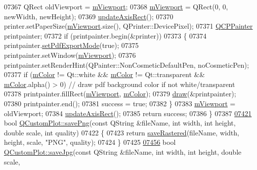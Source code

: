 \begin{DoxyCode}
07367   QRect oldViewport = \hyperlink{a00116_a69feeea9d5254eab8ba7f9be13f85e0b}{mViewport};
07368   \hyperlink{a00116_a69feeea9d5254eab8ba7f9be13f85e0b}{mViewport} = QRect(0, 0, newWidth, newHeight);
07369   \hyperlink{a00116_a428242419d3a1b63f2cbff637986c35c}{updateAxisRect}();
07370   printer.setPaperSize(\hyperlink{a00116_a69feeea9d5254eab8ba7f9be13f85e0b}{mViewport}.size(), QPrinter::DevicePixel);
07371   \hyperlink{a00047}{QCPPainter} printpainter;
07372   \textcolor{keywordflow}{if} (printpainter.begin(&printer))
07373   \{
07374     printpainter.\hyperlink{a00047_ae0931c24883ce8ea53103d3b80e0de56}{setPdfExportMode}(\textcolor{keyword}{true});
07375     printpainter.setWindow(\hyperlink{a00116_a69feeea9d5254eab8ba7f9be13f85e0b}{mViewport});
07376     printpainter.setRenderHint(QPainter::NonCosmeticDefaultPen, noCosmeticPen);
07377     \textcolor{keywordflow}{if} (\hyperlink{a00116_ac071280171e215ffc7d416118bc28d90}{mColor} != Qt::white && \hyperlink{a00116_ac071280171e215ffc7d416118bc28d90}{mColor} != Qt::transparent && \hyperlink{a00116_ac071280171e215ffc7d416118bc28d90}{mColor}.alpha() > 0) \textcolor{comment}{// draw
       pdf background color if not white/transparent}
07378       printpainter.fillRect(\hyperlink{a00116_a69feeea9d5254eab8ba7f9be13f85e0b}{mViewport}, \hyperlink{a00116_ac071280171e215ffc7d416118bc28d90}{mColor});
07379     \hyperlink{a00116_a2e9b3d14dffa43c79835869d488936c9}{draw}(&printpainter);
07380     printpainter.end();
07381     success = \textcolor{keyword}{true};
07382   \}
07383   \hyperlink{a00116_a69feeea9d5254eab8ba7f9be13f85e0b}{mViewport} = oldViewport;
07384   \hyperlink{a00116_a428242419d3a1b63f2cbff637986c35c}{updateAxisRect}();
07385   \textcolor{keywordflow}{return} success;
07386 \}
07387 
\hypertarget{a00115_source_l07421}{}\hyperlink{a00116_a7636261aff1f6d25c9da749ece3fc8b8}{07421} \textcolor{keywordtype}{bool} \hyperlink{a00116_a7636261aff1f6d25c9da749ece3fc8b8}{QCustomPlot::savePng}(\textcolor{keyword}{const} QString &fileName, \textcolor{keywordtype}{int} width, \textcolor{keywordtype}{int} height, \textcolor{keywordtype}{double} scale,
       \textcolor{keywordtype}{int} quality)
07422 \{  
07423   \textcolor{keywordflow}{return} \hyperlink{a00116_ab528b84cf92baabe29b1d0ef2f77c93e}{saveRastered}(fileName, width, height, scale, \textcolor{stringliteral}{"PNG"}, quality);
07424 \}
07425 
\hypertarget{a00115_source_l07456}{}\hyperlink{a00116_a490c722092d1771e8ce4a7a73dfd84ab}{07456} \textcolor{keywordtype}{bool} \hyperlink{a00116_a490c722092d1771e8ce4a7a73dfd84ab}{QCustomPlot::saveJpg}(\textcolor{keyword}{const} QString &fileName, \textcolor{keywordtype}{int} width, \textcolor{keywordtype}{int} height, \textcolor{keywordtype}{double} scale,

\end{DoxyCode}
